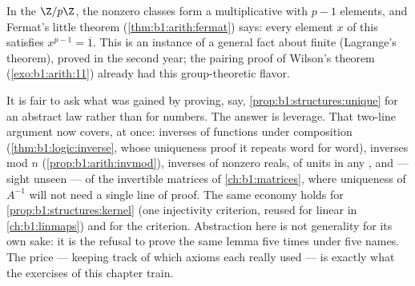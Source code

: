 \begin{remark}
In the  $\Z/p\Z$, the nonzero classes form a multiplicative 
with $p - 1$ elements, and Fermat's little theorem
(\cref{thm:b1:arith:fermat}) says: every element $x$ of this 
satisfies $x^{p-1} = \overline 1$. This is an instance of a general
fact about finite  (Lagrange's theorem), proved in the second
year; the pairing proof of Wilson's theorem
(\cref{exo:b1:arith:11}) already had this group-theoretic flavor.
\end{remark}

\begin{remark}\label{rem:b1:structures:interlude}
It is fair to ask what was gained by proving, say,
\cref{prop:b1:structures:unique} for an abstract law rather than
for numbers. The answer is leverage. That two-line argument now
covers, at once: inverses of functions under composition
(\cref{thm:b1:logic:inverse}, whose uniqueness proof it repeats
word for word), inverses mod $n$
(\cref{prop:b1:arith:invmod}), inverses of nonzero reals, of
units in any , and --- sight unseen --- of the invertible
matrices of \cref{ch:b1:matrices}, where uniqueness of $A^{-1}$
will not need a single line of proof. The same economy holds for
\cref{prop:b1:structures:kernel} (one injectivity criterion,
reused for linear  in \cref{ch:b1:linmaps}) and for the
 criterion. Abstraction here is not generality for its
own sake: it is the refusal to prove the same lemma five times
under five names. The price --- keeping track of which axioms
each  really used --- is exactly what the exercises of
this chapter train.
\end{remark}

